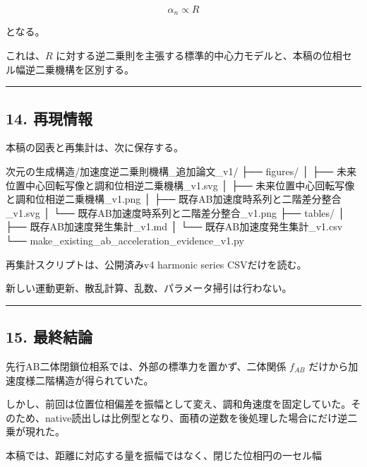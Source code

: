 \documentclass[
  10pt,
  a4paper,
]{ltjsarticle}
\newenvironment{Shaded}{}{}
\newcommand{\NormalTok}[1]{#1}
\begin{document}
\[
\alpha_n\propto R
\]

となる。

これは、\(R\)
に対する逆二乗則を主張する標準的中心力モデルと、本稿の位相セル幅逆二乗機構を区別する。

\begin{center}\rule{0.5\linewidth}{0.5pt}\end{center}

\subsection{14. 再現情報}\label{ux518dux73feux60c5ux5831}

本稿の図表と再集計は、次に保存する。

\begin{Shaded}
\begin{Highlighting}[]
\NormalTok{次元の生成構造/加速度逆二乗則機構\_追加論文\_v1/}
\NormalTok{├── figures/}
\NormalTok{│   ├── 未来位置中心回転写像と調和位相逆二乗機構\_v1.svg}
\NormalTok{│   ├── 未来位置中心回転写像と調和位相逆二乗機構\_v1.png}
\NormalTok{│   ├── 既存AB加速度時系列と二階差分整合\_v1.svg}
\NormalTok{│   └── 既存AB加速度時系列と二階差分整合\_v1.png}
\NormalTok{├── tables/}
\NormalTok{│   ├── 既存AB加速度発生集計\_v1.md}
\NormalTok{│   └── 既存AB加速度発生集計\_v1.csv}
\NormalTok{└── make\_existing\_ab\_acceleration\_evidence\_v1.py}
\end{Highlighting}
\end{Shaded}

再集計スクリプトは、公開済みv4 harmonic series CSVだけを読む。

新しい運動更新、散乱計算、乱数、パラメータ掃引は行わない。

\begin{center}\rule{0.5\linewidth}{0.5pt}\end{center}

\subsection{15. 最終結論}\label{ux6700ux7d42ux7d50ux8ad6}

先行AB二体閉鎖位相系では、外部の標準力を置かず、二体関係 \(f_{AB}\)
だけから加速度様二階構造が得られていた。

しかし、前回は位置位相偏差を振幅として変え、調和角速度を固定していた。そのため、native読出しは比例型となり、面積の逆数を後処理した場合にだけ逆二乗が現れた。

本稿では、距離に対応する量を振幅ではなく、閉じた位相円の一セル幅
\end{document}
